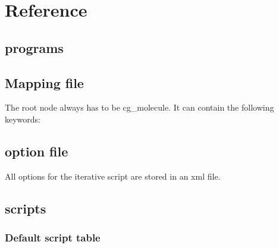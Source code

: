\chapter{Reference}
\section{programs}

\section{Mapping file}
\label{sec:ref_mapping}
The root node always has to be cg\_molecule. It can contain the following keywords:



\section{option file}
All options for the iterative script are stored in an xml file.
\label{sec:ref_options}


\section{scripts}
\subsection{Default script table}


